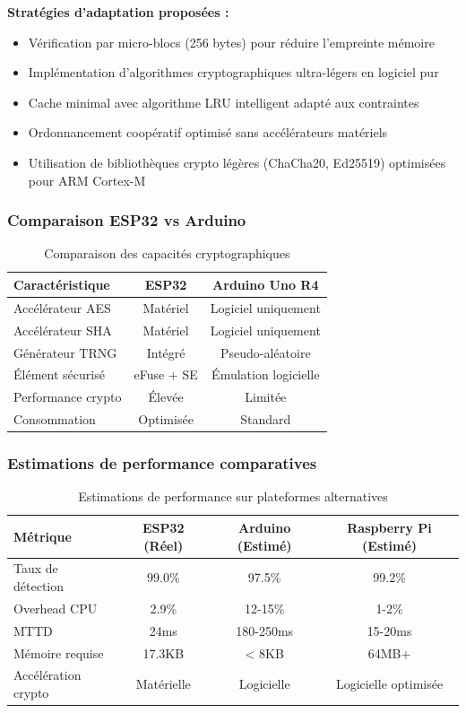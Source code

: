 \textbf{Stratégies d'adaptation proposées :}
\begin{itemize}
    \item Vérification par micro-blocs (256 bytes) pour réduire l'empreinte mémoire
    \item Implémentation d'algorithmes cryptographiques ultra-légers en logiciel pur
    \item Cache minimal avec algorithme LRU intelligent adapté aux contraintes
    \item Ordonnancement coopératif optimisé sans accélérateurs matériels
    \item Utilisation de bibliothèques crypto légères (ChaCha20, Ed25519) optimisées pour ARM Cortex-M
\end{itemize}

\subsubsection{Comparaison ESP32 vs Arduino}

\begin{table}[h]
\centering
\caption{Comparaison des capacités cryptographiques}
\label{tab:esp32-vs-arduino}
\begin{tabular}{|l|c|c|}
\hline
\textbf{Caractéristique} & \textbf{ESP32} & \textbf{Arduino Uno R4} \\
\hline
Accélérateur AES & Matériel & Logiciel uniquement \\
Accélérateur SHA & Matériel & Logiciel uniquement \\
Générateur TRNG & Intégré & Pseudo-aléatoire \\
Élément sécurisé & eFuse + SE & Émulation logicielle \\
Performance crypto & Élevée & Limitée \\
Consommation & Optimisée & Standard \\
\hline
\end{tabular}
\end{table}

\subsubsection{Estimations de performance comparatives}

\begin{table}[h]
\centering
\caption{Estimations de performance sur plateformes alternatives}
\label{tab:alternative-platforms-estimates}
\begin{tabular}{|l|c|c|c|}
\hline
\textbf{Métrique} & \textbf{ESP32 (Réel)} & \textbf{Arduino (Estimé)} & \textbf{Raspberry Pi (Estimé)} \\
\hline
Taux de détection & 99.0\% & 97.5\% & 99.2\% \\
Overhead CPU & 2.9\% & 12-15\% & 1-2\% \\
MTTD & 24ms & 180-250ms & 15-20ms \\
Mémoire requise & 17.3KB & < 8KB & 64MB+ \\
Accélération crypto & Matérielle & Logicielle & Logicielle optimisée \\
\hline
\end{tabular}
\end{table}

